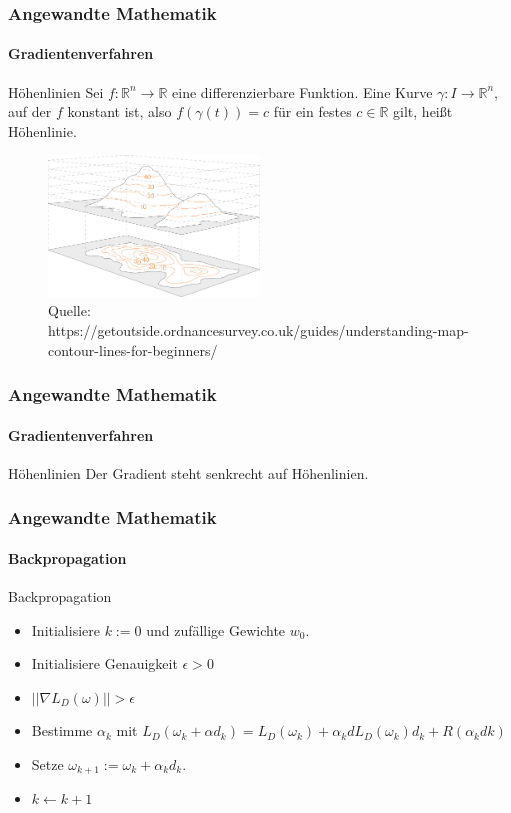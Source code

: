 \documentclass{beamer}
\begin{document}
\begin{frame}
    \frametitle{Angewandte Mathematik}
\framesubtitle{Gradientenverfahren}
    \begin{block}{Höhenlinien}
Sei  $f: \mathbb{R}^n \to \mathbb{R}$  eine differenzierbare Funktion. Eine Kurve $\gamma : I \to \mathbb{R}^n$, auf der $f$ konstant ist, also 
$f(\gamma(t)) = c$ für ein festes $c \in \mathbb{R}$ gilt, heißt Höhenlinie.
\end{block}

\begin{figure}[H]
      \centering
    \includegraphics[width=0.5\textwidth]{images/Contours-and-relief}
      \caption{Quelle: https://getoutside.ordnancesurvey.co.uk/guides/understanding-map-contour-lines-for-beginners/}
\end{figure}

 \end{frame}


\begin{frame}
    \frametitle{Angewandte Mathematik}
\framesubtitle{Gradientenverfahren}
    \begin{block}{Höhenlinien}
Der Gradient steht senkrecht auf  Höhenlinien. 
\end{block}
  

 \end{frame}




\begin{frame}
    \frametitle{Angewandte Mathematik}
\framesubtitle{Backpropagation}
    \begin{block}{Backpropagation}
\begin{itemize}
\item  Initialisiere $k:=0$ und zufällige Gewichte $w_0$.
\item \pause Initialisiere Genauigkeit $\epsilon > 0$
\item \pause   {} {$|| \nabla L_D(\omega) || > \epsilon$}  
\item \pause Bestimme $\alpha_k$  mit $ L_D(\omega_k + \alpha d_k) =  L_D(\omega_k) + \alpha_k d L_D(\omega_k)d_k + R( \alpha_k dk)$ 
\item \pause  Setze $\omega_{k+1} := \omega_k  + \alpha_k d_k$. 
\item \pause $k \leftarrow k+1$
\end{itemize}
\end{block}
 \end{frame}
\end{document}
